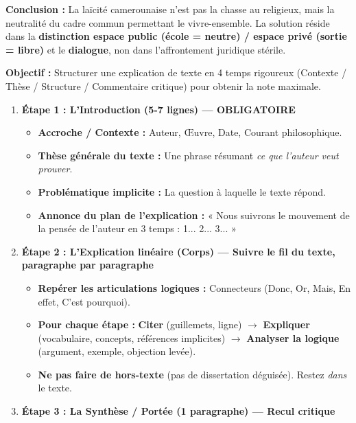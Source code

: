 \documentclass[11pt]{article}
\newcommand{\cle}[1]{{\popxbold\color{popdark}#1}}
\begin{document}
\begin{exoresolu}
\textbf{Conclusion :} La laïcité camerounaise n'est pas la chasse au religieux, mais la \cle{neutralité du cadre commun} permettant le \cle{vivre-ensemble}. La solution réside dans la \textbf{distinction espace public (école = neutre) / espace privé (sortie = libre)} et le \textbf{dialogue}, non dans l'affrontement juridique stérile.
\end{exoresolu}

\begin{methode}
\textbf{Objectif :} Structurer une explication de texte en 4 temps rigoureux (Contexte / Thèse / Structure / Commentaire critique) pour obtenir la note maximale.
\begin{enumerate}
    \item \textbf{Étape 1 : L'Introduction (5-7 lignes) — \cle{OBLIGATOIRE}}
    \begin{itemize}
        \item \textbf{Accroche / Contexte :} Auteur, Œuvre, Date, Courant philosophique.
        \item \textbf{Thèse générale du texte :} Une phrase résumant \emph{ce que l'auteur veut prouver}.
        \item \textbf{Problématique implicite :} La question à laquelle le texte répond.
        \item \textbf{Annonce du plan de l'explication :} « Nous suivrons le mouvement de la pensée de l'auteur en 3 temps : 1... 2... 3... »
    \end{itemize}
    \item \textbf{Étape 2 : L'Explication linéaire (Corps) — \cle{Suivre le fil du texte, paragraphe par paragraphe}}
    \begin{itemize}
        \item \textbf{Repérer les articulations logiques :} Connecteurs (Donc, Or, Mais, En effet, C'est pourquoi).
        \item \textbf{Pour chaque étape :} \textbf{Citer} (guillemets, ligne) $\rightarrow$ \textbf{Expliquer} (vocabulaire, concepts, références implicites) $\rightarrow$ \textbf{Analyser la logique} (argument, exemple, objection levée).
        \item \textbf{Ne pas faire de hors-texte} (pas de dissertation déguisée). Restez \emph{dans} le texte.
    \end{itemize}
    \item \textbf{Étape 3 : La Synthèse / Portée (1 paragraphe) — \cle{Recul critique}}
    \begin{itemize}

\end{itemize}
\end{enumerate}
\end{methode}
\end{document}

